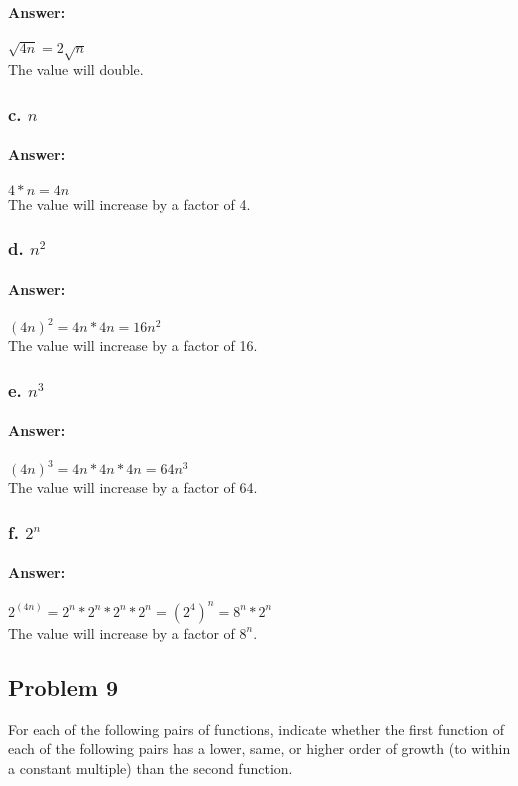 \documentclass{article}
\begin{document}
      \paragraph{Answer:}
          $\sqrt{4n} = 2\sqrt{n}$ \\
          The value will double.
    \subsubsection{c. $n$}
      \paragraph{Answer:}
        $4*n = 4n$ \\
        The value will increase by a factor of 4.
    \subsubsection{d. $n^2$}
      \paragraph{Answer:}
        $(4n)^2 = 4n * 4n = 16n^2$ \\
        The value will increase by a factor of 16.
    \subsubsection{e. $n^3$}
      \paragraph{Answer:}
        $(4n)^3 = 4n * 4n * 4n = 64n^3$ \\
        The value will increase by a factor of 64.
    \subsubsection{f. $2^n$}
      \paragraph{Answer:}
        $2^(4n) = 2^n * 2^n * 2^n * 2^n = (2^4)^n = 8^n * 2^n$ \\
        The value will increase by a factor of $8^n$.
  \subsection{Problem 9}
        For each of the following pairs of functions, indicate whether the first function
        of each of the following pairs has a lower, same, or higher order of growth (to
        within a constant multiple) than the second function.
\end{document}
